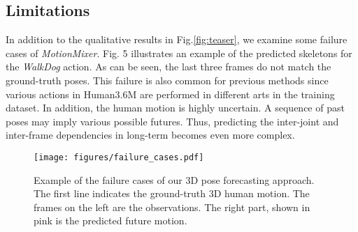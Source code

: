 \documentclass{article}
\begin{document}
\begin{table}[h]

	\centering
	\small
	\tabcolsep=1mm
	\caption{Computational complexity analysis. () indicates results with the average error over all frames. }
	\label{tbl:complexity}
\end{table}

 \subsection{Limitations}
 
In addition to the qualitative results in Fig.\ref{fig:teaser}, we examine some failure cases of \textit{MotionMixer}. Fig. 5 illustrates an example of the predicted skeletons for the \textit{WalkDog} action. As can be seen, the last three frames do not match the ground-truth poses. This failure is also common for previous methods \cite{mao2021multi,sofianos2021space} since various actions in Human3.6M are performed in different arts in the training dataset. In addition, the human motion is highly uncertain. A sequence of past poses may imply various possible futures. Thus, predicting the inter-joint and inter-frame dependencies in long-term becomes even more complex.




\begin{figure} [htp!]
    \centering
    \vspace{-0.1in}
    \texttt{[image: figures/failure\_cases.pdf]}
    \caption{Example of the failure cases of our 3D pose forecasting approach. The first line indicates the ground-truth 3D human motion.  The frames on the left are the observations. The right part, shown in pink is the predicted future motion.}
   \label{fig:failures}
\end{figure}
\end{document}

